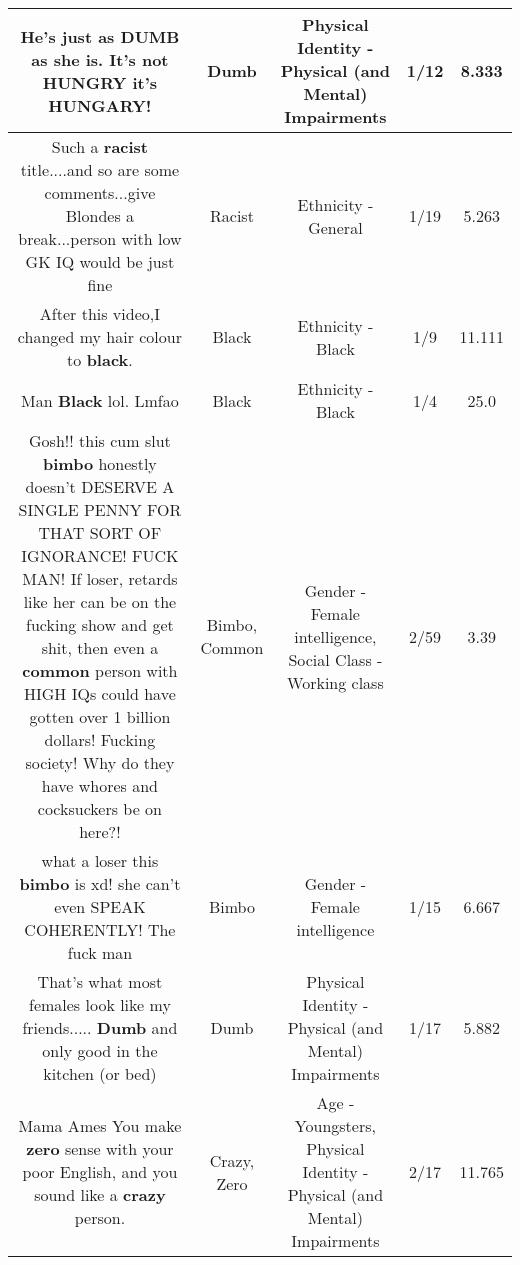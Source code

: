 \documentclass[11pt]{article}
\newlength\mylength
\begin{document}
\begin{center}
\begin{longtable}{|C{.65\mylength}|C{.30\mylength}|C{.12\mylength}|C{.12\mylength}|C{.12\mylength}|}
  \small He's just as \textbf{DUMB} as she is. It's not HUNGRY it's HUNGARY!\normalsize   & Dumb & Physical Identity - Physical (and Mental) Impairments & 1/12 & 8.333 \\  \hline
  \small Such a \textbf{racist} title....and so are some comments...give Blondes a break...person with low GK IQ would be just fine\normalsize   & Racist & Ethnicity - General & 1/19 & 5.263 \\  \hline
  \small After this video,I changed my hair colour to \textbf{black}.\normalsize   & Black & Ethnicity - Black & 1/9 & 11.111 \\  \hline
  \small Man \textbf{Black} lol. Lmfao\normalsize   & Black & Ethnicity - Black & 1/4 & 25.0 \\  \hline
  \small Gosh!! this cum slut \textbf{bimbo} honestly doesn't DESERVE A SINGLE PENNY FOR THAT SORT OF IGNORANCE! FUCK MAN! If loser, retards like her can be on the fucking show and get shit, then even a \textbf{common} person with HIGH IQs could have gotten over 1 billion dollars! Fucking society! Why do they have whores and cocksuckers be on here?!\normalsize   & Bimbo, Common & Gender - Female intelligence, Social Class - Working class & 2/59 & 3.39 \\  \hline
  \small what a loser this \textbf{bimbo} is xd! she can't even SPEAK COHERENTLY! The fuck man\normalsize   & Bimbo & Gender - Female intelligence & 1/15 & 6.667 \\  \hline
  \small That's what most females look like my friends..... \textbf{Dumb} and only good in the kitchen (or bed)\normalsize   & Dumb & Physical Identity - Physical (and Mental) Impairments & 1/17 & 5.882 \\  \hline
  \small Mama Ames You make \textbf{zero} sense with your poor English, and you sound like a \textbf{crazy} person.\normalsize   & Crazy, Zero & Age - Youngsters, Physical Identity - Physical (and Mental) Impairments & 2/17 & 11.765 \\  \hline

\end{longtable}
\end{center}
\end{document}
